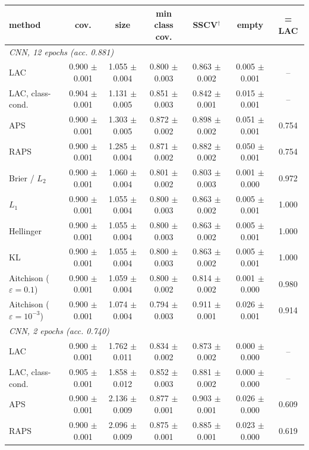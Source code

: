 \begin{tabular}{lcccccc}
\toprule
method & cov. & size & min class cov. & SSCV$^\dagger$ & empty & = LAC \\
\midrule
\multicolumn{7}{l}{\emph{CNN, 12 epochs (acc. 0.881)}} \\
LAC & 0.900 $\pm$ 0.001 & 1.055 $\pm$ 0.004 & 0.800 $\pm$ 0.003 & 0.863 $\pm$ 0.002 & 0.005 $\pm$ 0.001 & -- \\
LAC, class-cond. & 0.904 $\pm$ 0.001 & 1.131 $\pm$ 0.005 & 0.851 $\pm$ 0.003 & 0.842 $\pm$ 0.001 & 0.015 $\pm$ 0.001 & -- \\
APS & 0.900 $\pm$ 0.001 & 1.303 $\pm$ 0.005 & 0.872 $\pm$ 0.002 & 0.898 $\pm$ 0.002 & 0.051 $\pm$ 0.001 & 0.754 \\
RAPS & 0.900 $\pm$ 0.001 & 1.285 $\pm$ 0.004 & 0.871 $\pm$ 0.002 & 0.882 $\pm$ 0.002 & 0.050 $\pm$ 0.001 & 0.754 \\
Brier / $L_2$ & 0.900 $\pm$ 0.001 & 1.060 $\pm$ 0.004 & 0.801 $\pm$ 0.002 & 0.803 $\pm$ 0.003 & 0.001 $\pm$ 0.000 & 0.972 \\
$L_1$ & 0.900 $\pm$ 0.001 & 1.055 $\pm$ 0.004 & 0.800 $\pm$ 0.003 & 0.863 $\pm$ 0.002 & 0.005 $\pm$ 0.001 & 1.000 \\
Hellinger & 0.900 $\pm$ 0.001 & 1.055 $\pm$ 0.004 & 0.800 $\pm$ 0.003 & 0.863 $\pm$ 0.002 & 0.005 $\pm$ 0.001 & 1.000 \\
KL & 0.900 $\pm$ 0.001 & 1.055 $\pm$ 0.004 & 0.800 $\pm$ 0.003 & 0.863 $\pm$ 0.002 & 0.005 $\pm$ 0.001 & 1.000 \\
Aitchison ($\varepsilon{=}0.1$) & 0.900 $\pm$ 0.001 & 1.059 $\pm$ 0.004 & 0.800 $\pm$ 0.002 & 0.814 $\pm$ 0.002 & 0.001 $\pm$ 0.000 & 0.980 \\
Aitchison ($\varepsilon{=}10^{-3}$) & 0.900 $\pm$ 0.001 & 1.074 $\pm$ 0.004 & 0.794 $\pm$ 0.003 & 0.911 $\pm$ 0.001 & 0.026 $\pm$ 0.001 & 0.914 \\
\midrule
\multicolumn{7}{l}{\emph{CNN, 2 epochs (acc. 0.740)}} \\
LAC & 0.900 $\pm$ 0.001 & 1.762 $\pm$ 0.011 & 0.834 $\pm$ 0.002 & 0.873 $\pm$ 0.002 & 0.000 $\pm$ 0.000 & -- \\
LAC, class-cond. & 0.905 $\pm$ 0.001 & 1.858 $\pm$ 0.012 & 0.852 $\pm$ 0.003 & 0.881 $\pm$ 0.002 & 0.000 $\pm$ 0.000 & -- \\
APS & 0.900 $\pm$ 0.001 & 2.136 $\pm$ 0.009 & 0.877 $\pm$ 0.001 & 0.903 $\pm$ 0.001 & 0.026 $\pm$ 0.000 & 0.609 \\
RAPS & 0.900 $\pm$ 0.001 & 2.096 $\pm$ 0.009 & 0.875 $\pm$ 0.001 & 0.885 $\pm$ 0.001 & 0.023 $\pm$ 0.000 & 0.619 \\

\end{tabular}
